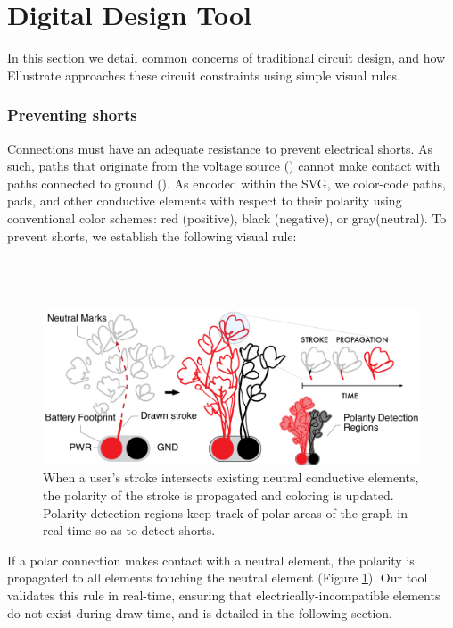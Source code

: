 \documentclass{sigchi}
\begin{document}
\section{Digital Design Tool}
    In this section we detail common concerns of traditional circuit design, and how Ellustrate approaches these circuit constraints using simple visual rules.

    \subsubsection{Preventing shorts}
    Connections must have an adequate resistance to prevent electrical shorts. As such, paths that originate from the voltage source () cannot make contact with paths connected to ground (). As encoded within the SVG, we color-code paths, pads, and other conductive elements with respect to their polarity using conventional color schemes: red (positive), black (negative), or gray(neutral). To prevent shorts, we establish the following visual rule:
    \\
    \\
    \noindent{}
    \\
    \\
\begin{figure}[h]
\centering
\includegraphics[width=1.0\columnwidth]{figures/propagation.pdf}
\caption{When a user's stroke intersects existing neutral conductive elements, the polarity of the stroke is propagated and coloring is updated. Polarity detection regions keep track of polar areas of the graph in real-time so as to detect shorts.}

\label{fig:propagation}
\end{figure}
    If a polar connection makes contact with a neutral element, the polarity is propagated to all elements touching the neutral element (Figure \ref{fig:propagation}). 
    Our tool validates this rule in real-time, ensuring that electrically-incompatible elements do not exist during draw-time, and is detailed in the following section. 
\end{document}
